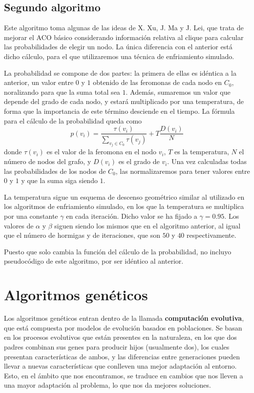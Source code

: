 \subsection{Segundo algoritmo}

Este algoritmo toma algunas de las ideas de X. Xu, J. Ma y J. Lei, que trata de mejorar el ACO básico considerando
información relativa al clique para calcular las probabilidades de elegir un nodo. La única diferencia con el anterior
está dicho cálculo, para el que utilizaremos una técnica de enfriamiento simulado.

La probabilidad se compone de dos partes: la primera de ellas es idéntica a la anterior, un valor entre $0$ y $1$
obtenido de las feromonas de cada nodo en $C_0$, noralizando para que la suma total sea $1$. Además, sumaremos un
valor que depende del grado de cada nodo, y estará multiplicado por una temperatura, de forma que la importancia
de este término desciende en el tiempo. La fórmula para el cálculo de la probabilidad queda como
\[ p(v_i) = \frac{\tau(v_i)}{\sum_{v_j \in C_0} \tau(v_j)} + T \frac{D(v_i)}{N} \]
donde $\tau(v_i)$ es el valor de la feromona en el nodo $v_i$, $T$ es la temperatura, $N$ el número de nodos
del grafo, y $D(v_i)$ es el grado de $v_i$. Una vez calculadas todas las probabilidades de los nodos de $C_0$,
las normalizaremos para tener valores entre $0$ y $1$ y que la suma siga siendo $1$.

La temperatura sigue un esquema de descenso geométrico similar al utilizado en los algoritmos de enfriamiento simulado,
en los que la temperatura se multiplica por una constante $\gamma$ en cada iteración. Dicho valor se ha fijado a
$\gamma = 0.95$. Los valores de $\alpha$ y $\beta$ siguen siendo los mismos que en el algoritmo anterior, al igual
que el número de hormigas y de iteraciones, que son $50$ y $40$ respectivamente.

Puesto que solo cambia la función del cálculo de la probabilidad, no incluyo pseudocódigo de este algoritmo,
por ser idéntico al anterior.

\section{Algoritmos genéticos}

Los algoritmos genéticos entran dentro de la llamada \textbf{computación evolutiva},
que está compuesta por modelos de evolución basados en poblaciones. Se basan en
los procesos evolutivos que están presentes en la naturaleza, en los que dos padres
combinan sus genes para producir hijos (usualmente dos), los cuales presentan
características de ambos, y las diferencias entre generaciones pueden llevar a nuevas
características que conlleven una mejor adaptación al entorno. Esto, en el ámbito
que nos encontramos, se traduce en cambios que nos lleven a una mayor adaptación
al problema, lo que nos da mejores soluciones.

